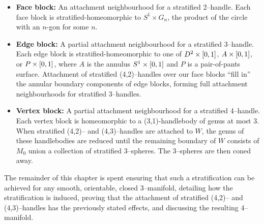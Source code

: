 {\renewcommand\labelitemi{}
\begin{itemize}
	\item \textbf{Face block:}
		An attachment neighbourhood for a stratified 2--handle.
		Each face block is stratified-homeomorphic to $S^1\times G_n$, the product of the circle with an $n$-gon for some $n$.
	
	\item \textbf{Edge block:}
		A partial attachment neighbourhood for a stratified 3--handle.
		Each edge block is stratified-homeomorphic to one of $D^2\times[0,1]$, $A\times[0,1]$, or $P\times[0,1]$, where $A$ is the annulus $S^1\times[0,1]$ and $P$ is a pair-of-pants surface.
		Attachment of stratified (4,2)--handles over our face blocks ``fill in'' the annular boundary components of edge blocks, forming full attachment neighbourhoods for stratified 3--handles.
		
	\item \textbf{Vertex block:}
		A partial attachment neighbourhood for a stratified 4--handle.
		Each vertex block is homeomorphic to a (3,1)-handlebody of genus at most 3.
		When stratified (4,2)-- and (4,3)--handles are attached to $W$, the genus of these handlebodies are reduced until the remaining boundary of $W$ consists of $M_0$ union a collection of stratified 3--spheres.  The 3--spheres are then coned away.
\end{itemize}
}
 
The remainder of this chapter is spent ensuring that such a stratification can be achieved for any smooth, orientable, closed 3--manifold, detailing how the stratification is induced, proving that the attachment of stratified (4,2)-- and (4,3)--handles has the previously stated effects, and discussing the resulting 4--manifold.









%
